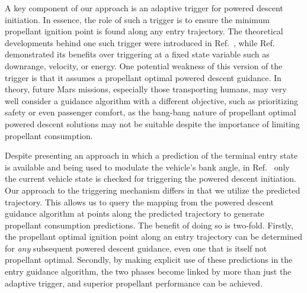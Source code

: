 \documentclass[letterpaper, preprint, paper,11pt]{AAS}
\begin{document}
A key component of our approach is an adaptive trigger for powered descent initiation.  In essence, the role of such a trigger is to ensure the minimum propellant ignition point is found along any entry trajectory. The theoretical developments behind one such trigger were introduced in Ref.~\cite{PropellantOptimalAdaptiveTrigger}, while Ref.~\cite{LuAdaptiveEDL} demonstrated its benefits over triggering at a fixed state variable such as downrange, velocity, or energy.
One potential weakness of this version of the trigger is that it assumes a propellant optimal powered descent guidance. In theory, future Mars missions, especially those transporting humans, may very well consider a guidance algorithm with a different objective, such as prioritizing safety or even passenger comfort, as the bang-bang nature of propellant optimal powered descent solutions may not be suitable despite the importance of limiting propellant consumption. 

Despite presenting an approach in which a prediction of the terminal entry state is available and being used to modulate the vehicle's bank angle, in Ref.~\cite{LuAdaptiveEDL} only the current vehicle state is checked for triggering the powered descent initiation. Our approach to the triggering mechanism differs in that we utilize the predicted trajectory. This allows us to query the mapping from the powered descent guidance algorithm at points along the predicted trajectory to generate propellant consumption predictions.  The benefit of doing so is two-fold. Firstly, the propellant optimal ignition point along an entry trajectory can be determined for \textit{any} subsequent powered descent guidance, even one that is itself not propellant optimal. Secondly, by making explicit use of these predictions in the entry guidance algorithm, the two phases become linked by more than just the adaptive trigger, and superior propellant performance can be achieved. 

\end{document}
